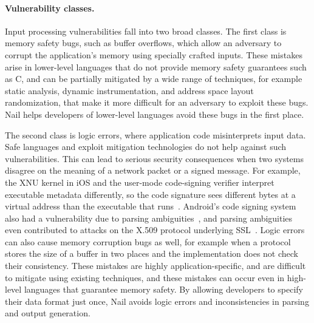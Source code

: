 \paragraph{Vulnerability classes.}

Input processing vulnerabilities fall into two broad classes.  The first
class is memory safety bugs, such as buffer overflows, which allow an
adversary to corrupt the application's memory using specially crafted
inputs.  These mistakes arise in lower-level languages that do not
provide memory safety guarantees such as C, and can be partially
mitigated by a wide range of techniques, for example static analysis,
dynamic instrumentation, and address space layout randomization, that
make it more difficult for an adversary to exploit these bugs.
Nail helps developers of lower-level languages avoid these bugs
in the first place.

The second class is logic errors, where application code misinterprets
input data. Safe languages and exploit mitigation technologies do not
help against such vulnerabilities. This can lead to serious security
consequences when two systems disagree on the meaning of a network
packet or a signed message.  For example, the XNU kernel in iOS and the
user-mode code-signing verifier interpret executable metadata differently,
so the code signature sees different bytes at a virtual address than the
executable that runs~\cite{evaders6}. 
Android's code signing system also
had a vulnerability due to parsing ambiguities~\cite{saurik-masterkey},
and parsing ambiguities even contributed to attacks on the X.509 protocol
underlying SSL~\cite{DBLP:conf/fc/KaminskyPS10}.  Logic errors can also
cause memory corruption bugs as well, for example when a protocol stores
the size of a buffer in two places and the implementation does not check
their consistency. These mistakes are highly application-specific, and
are difficult to mitigate using existing techniques, and these mistakes
can occur even in high-level languages that guarantee memory safety. By
allowing developers to specify their data format just once, Nail avoids
logic errors and inconsistencies in parsing and output generation.


